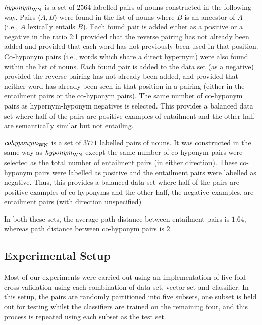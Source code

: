 \documentclass[11pt]{article}
\newcommand\entWN{\mbox{\em hyponym\/}_{\mbox{\scriptsize WN}}}
\newcommand\coordWN{\mbox{\em cohyponym\/}_{\mbox{\scriptsize WN}}}
\begin{document}
\smallskip

\noindent $\entWN$ is a set of $2564$ labelled pairs of nouns constructed in the following way.  Pairs $\langle A,B\rangle$ were found in the list of nouns where $B$ is an ancestor of $A$ (i.e., $A$ lexically entails $B$).  Each found pair is added either as a positive or a negative in the ratio 2:1 provided that the reverse pairing has not already been added and provided that each word has not previously been used in that position.  Co-hyponym pairs (i.e., words which share a direct hypernym) were also found within the list of nouns.  Each found pair is added to the data set (as a negative) provided the reverse pairing has not already been added, and provided that neither word has already been seen in that position in a pairing (either in the entailment pairs or the co-hyponym pairs).  The same number of co-hyponym pairs as hypernym-hyponym negatives is selected.   This provides a balanced data set where half of the pairs are positive examples of entailment and the other half are semantically similar but not entailing.

\smallskip

\noindent $\coordWN$ is a set of $3771$ labelled pairs of nouns.  It was constructed in the same way as $\entWN$ except the same number of co-hyponym pairs were selected as the total number of entailment pairs (in either direction).  These co-hyponym pairs were labelled as positive and the entailment pairs were labelled as negative.  Thus, this provides a balanced data set where half of the pairs are positive examples of co-hyponyms and the other half, the negative examples, are entailment pairs (with direction unspecified)

\smallskip

In both these sets, the average path distance between entailment pairs is $1.64$, whereas path distance between co-hyponym pairs is $2$.

\subsection{Experimental Setup}

Most of our experiments were carried out using an implementation of
five-fold cross-validation using each combination of data set, vector
set and classifier.  In this setup, the pairs are randomly partitioned
into five subsets, one subset is held out for testing whilst the
classifiers are trained on the remaining four, and this process is
repeated using each subset as the test set.
\end{document}
